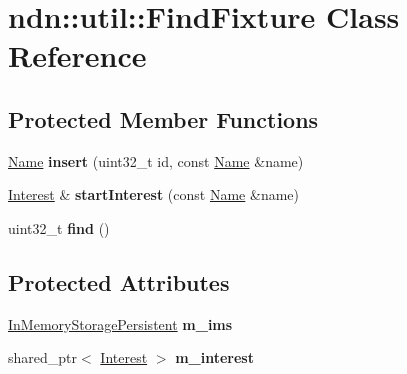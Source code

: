 \hypertarget{classndn_1_1util_1_1FindFixture}{}\section{ndn\+:\+:util\+:\+:Find\+Fixture Class Reference}
\label{classndn_1_1util_1_1FindFixture}
\subsection*{Protected Member Functions}
\begin{DoxyCompactItemize}
\item 
\hyperlink{classndn_1_1Name}{Name} {\bfseries insert} (uint32\+\_\+t id, const \hyperlink{classndn_1_1Name}{Name} \&name)\hypertarget{classndn_1_1util_1_1FindFixture_ade7c9e611940c714f80457149f1e271c}{}\label{classndn_1_1util_1_1FindFixture_ade7c9e611940c714f80457149f1e271c}

\item 
\hyperlink{classndn_1_1Interest}{Interest} \& {\bfseries start\+Interest} (const \hyperlink{classndn_1_1Name}{Name} \&name)\hypertarget{classndn_1_1util_1_1FindFixture_a336de61ff25f2702eed8579c84b32c9f}{}\label{classndn_1_1util_1_1FindFixture_a336de61ff25f2702eed8579c84b32c9f}

\item 
uint32\+\_\+t {\bfseries find} ()\hypertarget{classndn_1_1util_1_1FindFixture_aa3a5aba68c45aa6897636737877b1331}{}\label{classndn_1_1util_1_1FindFixture_aa3a5aba68c45aa6897636737877b1331}

\end{DoxyCompactItemize}
\subsection*{Protected Attributes}
\begin{DoxyCompactItemize}
\item 
\hyperlink{classndn_1_1util_1_1InMemoryStoragePersistent}{In\+Memory\+Storage\+Persistent} {\bfseries m\+\_\+ims}\hypertarget{classndn_1_1util_1_1FindFixture_a73dae164993843ae0c06971e0d73b536}{}\label{classndn_1_1util_1_1FindFixture_a73dae164993843ae0c06971e0d73b536}

\item 
shared\+\_\+ptr$<$ \hyperlink{classndn_1_1Interest}{Interest} $>$ {\bfseries m\+\_\+interest}\hypertarget{classndn_1_1util_1_1FindFixture_ae627f1c8e38f521761e39c811b8dbcdd}{}\label{classndn_1_1util_1_1FindFixture_ae627f1c8e38f521761e39c811b8dbcdd}

\end{DoxyCompactItemize}


